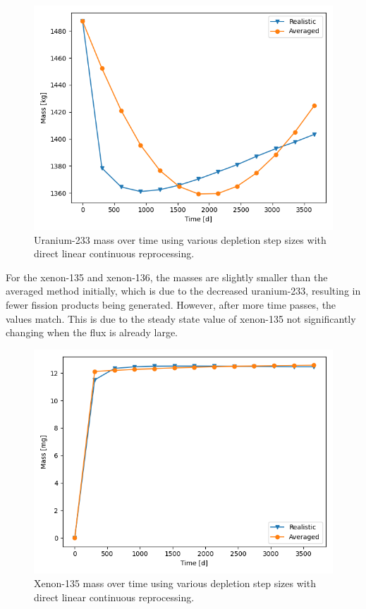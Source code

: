 \begin{figure}[H]
  \centering
  \includegraphics[scale=0.5]{images/adv-U233.png}
  \caption{Uranium-233 mass over time using various depletion step sizes with direct linear continuous reprocessing.}
   \label{fig:DL-cont-u-adv}
\end{figure}

For the xenon-135 and xenon-136, the masses are slightly smaller than the averaged method initially, which is due to the decreased uranium-233, resulting in fewer fission products being generated. However, after more time passes, the values match. This is due to the steady state value of xenon-135 not significantly changing when the flux is already large.

\begin{figure}[H]
  \centering
  \includegraphics[scale=0.5]{images/adv-Xe135.png}
  \caption{Xenon-135 mass over time using various depletion step sizes with direct linear continuous reprocessing.}
   \label{fig:DL-cont-xe135-adv}
\end{figure}


